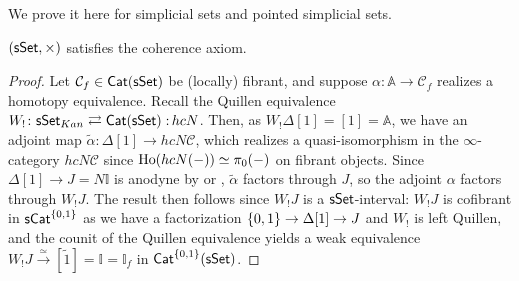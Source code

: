 \documentclass[a4paper,10pt
,draft
]{article}%
\newcommand{\I}{\mathbb I}
\renewcommand{\1}{\eta}%
\begin{document}
We prove it here for simplicial sets and pointed simplicial sets.
\begin{proposition}
      \label{SSET_COH_PROP}
      $(\mathsf{sSet}, \times)$
      satisfies the coherence axiom.
\end{proposition}
\begin{proof}
      Let $\mathcal C_f \in \mathsf{Cat}(\mathsf{sSet})$ be (locally) fibrant, and
      suppose $\alpha: \mathbb A \to \mathcal C_f$ realizes a homotopy equivalence.
      Recall the Quillen equivalence $W_!\colon \mathsf{sSet}_{Kan} \rightleftarrows \mathsf{Cat}(\mathsf{sSet}) \, \colon \! h c N$.
      Then, as $W_!\Delta[1] = [1] = \mathbb A$, we have an adjoint map $\tilde \alpha: \Delta[1] \to h c N \mathcal C$,
      which realizes a quasi-isomorphism in the $\infty$-category $h c N \mathcal C$ since $\operatorname{Ho}(h c N (-)) \simeq \pi_0(-)$ on fibrant objects.
      Since $\Delta[1] \to J = N \I$ is anodyne by \cite[Corollary 1.6]{Joy02} or \cite[Lemma 0.15]{Rie}, 
      $\tilde \alpha$ factors through $J$,
      so the adjoint $\alpha$ factors through $W_!J$.
      The result then follows since $W_!J$ is a $\mathsf{sSet}$-interval:
      $W_!J$ is cofibrant in $\mathsf{sCat}^{\left\{0,1\right\}}$ as we have a factorization $\left\{0,1\right\} \to \Delta[1] \to J$ and $W_!$ is left Quillen,
      and the counit of the Quillen equivalence %
      yields a weak equivalence $W_!J \xrightarrow{\simeq} [\tilde 1] = \mathbb I = \mathbb I_f$ in $\mathsf{Cat}^{\left\{0,1\right\}}(\mathsf{sSet})$.
\end{proof}

\end{document}
